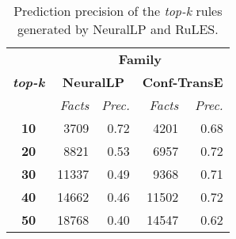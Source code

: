 \begin{table}[t]
\centering
\begin{tabular}{|c|r r|r r|}
 \hline
 \multirow{3}{*}{\textbf{\textit{top-k}}}&\multicolumn{4}{|c|}{\textbf{Family}}\\
 \cline{2-5}&\multicolumn{2}{|c|}{\textbf{NeuralLP}}&\multicolumn{2}{|c|}{\textbf{Conf-TransE}}\\
 & \textit{Facts} & \textit{Prec.} & \textit{Facts} & \textit{Prec.} \\
 \hline
\textbf{10} & 3709 & 0.72 & 4201 & 0.68 \\
\textbf{20} & 8821 & 0.53 & 6957 & 0.72 \\
\textbf{30} & 11337 & 0.49 & 9368 & 0.71 \\
\textbf{40} & 14662 & 0.46 & 11502 & 0.72 \\
\textbf{50} & 18768 & 0.40 & 14547 & 0.62 \\
 \hline
\end{tabular}
\caption{Prediction precision of the \textit{top-k} rules generated by NeuralLP and RuLES.}
\label{table:neurallp_vs_rules}
\end{table}
